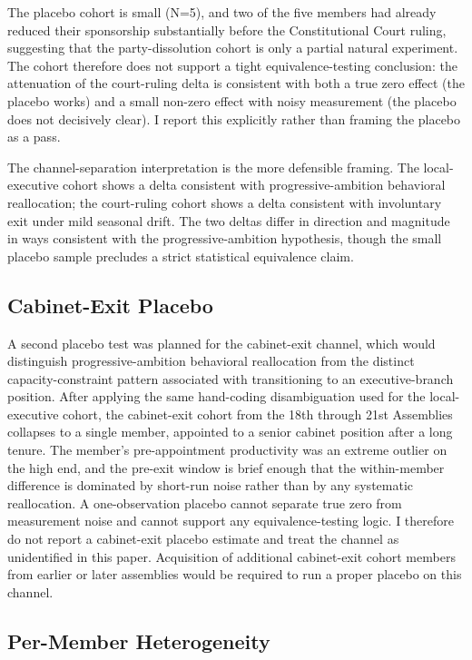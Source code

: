 \documentclass[11pt]{article}
\begin{document}
The placebo cohort is small (N=5), and two of the five members had already reduced their sponsorship substantially before the Constitutional Court ruling, suggesting that the party-dissolution cohort is only a partial natural experiment. The cohort therefore does not support a tight equivalence-testing conclusion: the attenuation of the court-ruling delta is consistent with both a true zero effect (the placebo works) and a small non-zero effect with noisy measurement (the placebo does not decisively clear). I report this explicitly rather than framing the placebo as a pass.

The channel-separation interpretation is the more defensible framing. The local-executive cohort shows a delta consistent with progressive-ambition behavioral reallocation; the court-ruling cohort shows a delta consistent with involuntary exit under mild seasonal drift. The two deltas differ in direction and magnitude in ways consistent with the progressive-ambition hypothesis, though the small placebo sample precludes a strict statistical equivalence claim.

\subsection{Cabinet-Exit Placebo}

A second placebo test was planned for the cabinet-exit channel, which would distinguish progressive-ambition behavioral reallocation from the distinct capacity-constraint pattern associated with transitioning to an executive-branch position. After applying the same hand-coding disambiguation used for the local-executive cohort, the cabinet-exit cohort from the 18th through 21st Assemblies collapses to a single member, appointed to a senior cabinet position after a long tenure. The member's pre-appointment productivity was an extreme outlier on the high end, and the pre-exit window is brief enough that the within-member difference is dominated by short-run noise rather than by any systematic reallocation. A one-observation placebo cannot separate true zero from measurement noise and cannot support any equivalence-testing logic. I therefore do not report a cabinet-exit placebo estimate and treat the channel as unidentified in this paper. Acquisition of additional cabinet-exit cohort members from earlier or later assemblies would be required to run a proper placebo on this channel.

\subsection{Per-Member Heterogeneity}
\end{document}
